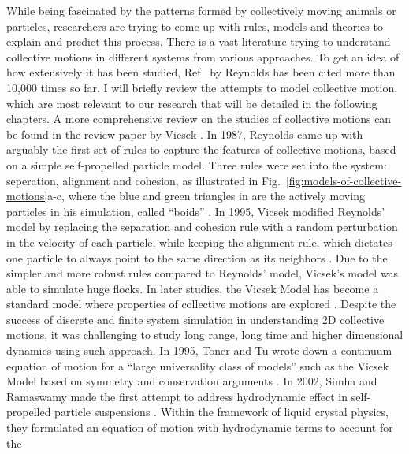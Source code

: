 While being fascinated by the patterns formed by collectively moving animals or particles, researchers are trying to come up with rules, models and theories to explain and predict this process. There is a vast literature trying to understand collective motions in different systems from various approaches. To get an idea of how extensively it has been studied, Ref~\cite{Reynolds1987} by Reynolds has been cited more than 10,000 times so far. I will briefly review the attempts to model collective motion, which are most relevant to our research that will be detailed in the following chapters. A more comprehensive review on the studies of collective motions can be found in the review paper by Vicsek \cite{Vicsek2012}. In 1987, Reynolds came up with arguably the first set of rules to capture the features of collective motions, based on a simple self-propelled particle model. Three rules were set into the system: seperation, alignment and cohesion, as illustrated in Fig.~\ref{fig:models-of-collective-motions}a-c, where  the blue and green triangles in are the actively moving particles in his simulation, called ``boids'' \cite{Reynolds1987}. In 1995, Vicsek modified Reynolds' model by replacing the separation and cohesion rule with a random perturbation in the velocity of each particle, while keeping the alignment rule, which dictates one particle to always point to the same direction as its neighbors \cite{Vicsek1995}. Due to the simpler and more robust rules compared to Reynolds' model, Vicsek's model was able to simulate huge flocks. In later studies, the Vicsek Model has become a standard model where properties of collective motions are explored
\cite{Gregoire2004, Chate2008, Ginelli2010, Ngo2014, Mahault2019}. Despite the success of discrete and finite system simulation in understanding 2D collective motions, it was challenging to study long range, long time and higher dimensional dynamics using such approach. In 1995, Toner and Tu wrote down a continuum equation of motion for a ``large universality class of models'' such as the Vicsek Model based on symmetry and conservation arguments \cite{Toner1995}. In 2002, Simha and Ramaswamy made the first attempt to address hydrodynamic effect in self-propelled particle suspensions \cite{Simha2002}. Within the framework of liquid crystal physics, they formulated an equation of motion with hydrodynamic terms to account for the
